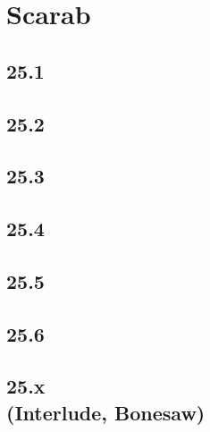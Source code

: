 \part{Scarab}

 \chapter{25.1}

 \chapter{25.2}

 \chapter{25.3}

 \chapter{25.4}

 \chapter{25.5}

 \chapter{25.6}

 \chapter[25.x (Interlude, Bonesaw)]{25.x\\(Interlude, Bonesaw)}








